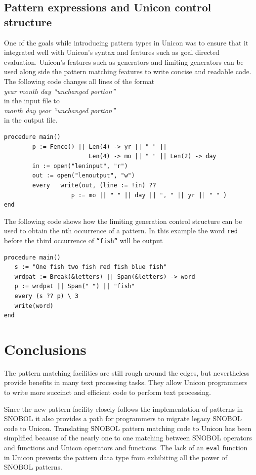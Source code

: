 \documentclass[letterpaper,12pt]{article}
\begin{document}
\subsection{Pattern expressions and Unicon control structure}

One of the goals while introducing pattern types in Unicon was to
ensure that it integrated well with Unicon's syntax and features such
as goal directed evaluation. Unicon’s features such as generators and
limiting generators can be used along side the pattern matching
features to write concise and readable code.
The following code changes all lines of the format \\
	\textit{year month day “unchanged portion”} \\
in the input file to \\
	\textit{month day year “unchanged portion”} \\
in the output file.

\begin{verbatim}
procedure main()
        p := Fence() || Len(4) -> yr || " " || 
                        Len(4) -> mo || " " || Len(2) -> day
        in := open("leninput", "r")
        out := open("lenoutput", "w")
        every	write(out, (line := !in) ?? 
                   p := mo || " " || day || ", " || yr || " " )
end
\end{verbatim}

The following code shows how the limiting generation control structure
can be used to obtain the nth occurrence of a pattern. In this example
the word \texttt{red} before the third occurrence of \texttt{“fish”}
will be output

\begin{verbatim}
procedure main()
   s := "One fish two fish red fish blue fish"
   wrdpat := Break(&letters) || Span(&letters) -> word
   p := wrdpat || Span(" ") || "fish"
   every (s ?? p) \ 3
   write(word)
end 
\end{verbatim}


\section{Conclusions}

The pattern matching facilities are still rough around the edges, but
nevertheless provide benefits in many text processing tasks. They
allow Unicon programmers to write more succinct and efficient code to
perform text processing.

Since the new pattern facility closely follows the implementation of
patterns in SNOBOL it also provides a path for programmers to
migrate legacy SNOBOL code to Unicon. Translating SNOBOL pattern
matching code to Unicon has been simplified because of the
nearly one to one matching between SNOBOL operators and functions and
Unicon operators and functions. The lack of an {\tt eval} function in
Unicon prevents the pattern data type from exhibiting all the power
of SNOBOL patterns.
\end{document}
